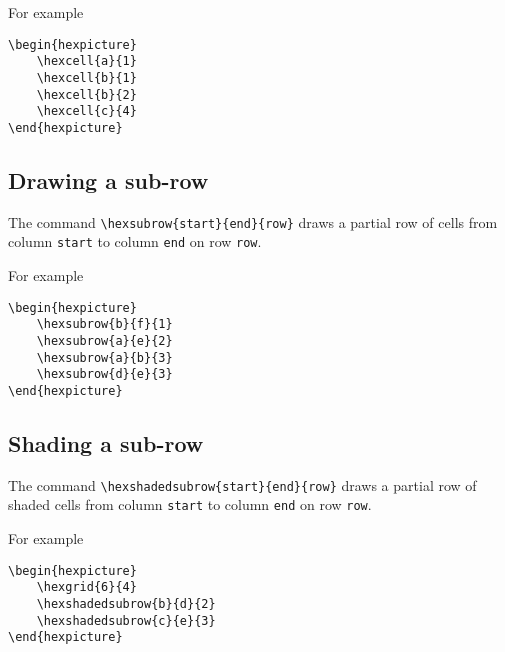 \documentclass[a4paper,12pt]{article}
\begin{document}
    For example
    
    \begin{verbatim}\begin{hexpicture}
    \hexcell{a}{1}
    \hexcell{b}{1}
    \hexcell{b}{2}
    \hexcell{c}{4}
\end{hexpicture}\end{verbatim}
    
    \begin{hexpicture}
    \end{hexpicture}
    
    \subsection{Drawing a sub-row}
    
    The command \verb|\hexsubrow{start}{end}{row}| draws a partial row of cells from column \verb|start| to column \verb|end| on row \verb|row|.
    
    For example
    
    \begin{verbatim}\begin{hexpicture}
    \hexsubrow{b}{f}{1}
    \hexsubrow{a}{e}{2}
    \hexsubrow{a}{b}{3}
    \hexsubrow{d}{e}{3}
\end{hexpicture}\end{verbatim}

    \begin{hexpicture}
    \end{hexpicture}

    \subsection{Shading a sub-row}
    
    The command \verb|\hexshadedsubrow{start}{end}{row}| draws a partial row of shaded cells from column \verb|start| to column \verb|end| on row \verb|row|.
    
    For example
    
    \begin{verbatim}\begin{hexpicture}
    \hexgrid{6}{4}
    \hexshadedsubrow{b}{d}{2}
    \hexshadedsubrow{c}{e}{3}
\end{hexpicture}\end{verbatim}
    
\end{document}
